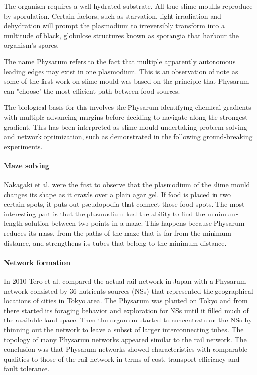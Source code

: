 \par
The organism requires a well hydrated substrate. All true slime moulds reproduce by sporulation. Certain factors, such as starvation, light irradiation and dehydration will prompt the plasmodium to irreversibly transform into a multitude of black, globulose structures known as sporangia that harbour the organism’s spores.
\par
The name Physarum refers to the fact that multiple apparently autonomous leading edges may exist in one plasmodium. This is an observation of note as some of the first work on slime mould was based on the principle that Physarum can "choose" the most efficient path between food sources.
\par
The biological basis for this involves the Physarum identifying chemical gradients with multiple advancing margins before deciding to navigate along the strongest gradient. This has been interpreted as slime mould undertaking problem solving and network optimization, such as demonstrated in the following ground-breaking experiments.

\paragraph{Maze solving}
Nakagaki et al. \cite{nakagaki2000intelligence} were the first to observe that the plasmodium of the slime mould changes its shape as it crawls over a plain agar gel. If food is placed in two certain spots, it puts out pseudopodia that connect those food spots. The most interesting part is that the plasmodium had the ability to find the minimum-length solution between two points in a maze. This happens because Physarum reduces its mass, from the paths of the maze that is far from the minimum distance, and strengthens its tubes that belong to the minimum distance.
\paragraph{Network formation}
In 2010 Tero et al. \cite{Tero439} compared the actual rail network in Japan with a Physarum network consisted by 36 nutrients sources (NSs) that represented the geographical locations of cities in Tokyo area. The Physarum was planted on Tokyo and from there started its foraging behavior and exploration for NSs until it filled much of the available land space. Then the organism started to concentrate on the NSs by thinning out the network to leave a subset of larger interconnecting tubes. The topology of many Physarum networks appeared similar to the rail network. The conclusion was that Physarum networks showed characteristics with comparable qualities to those of the rail network in terms of cost, transport efficiency and fault tolerance.\\

